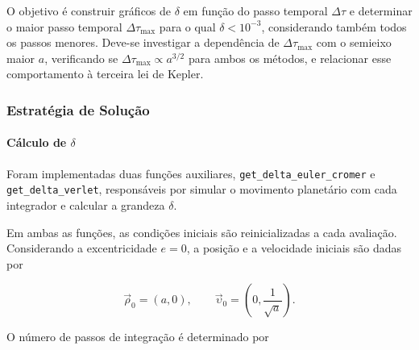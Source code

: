 \documentclass[12pt,a4paper]{article}
\begin{document}
O objetivo é construir gráficos de $\delta$ em função do passo temporal $\Delta\tau$ e determinar o maior passo temporal $\Delta\tau_{\max}$ para o qual $\delta<10^{-3}$, considerando também todos os passos menores. Deve-se investigar a dependência de $\Delta\tau_{\max}$ com o semieixo maior $a$, verificando se $\Delta\tau_{\max}\propto a^{3/2}$ para ambos os métodos, e relacionar esse comportamento à terceira lei de Kepler.

\subsubsection{Estratégia de Solução}

\paragraph{Cálculo de $\delta$}

Foram implementadas duas funções auxiliares,
\texttt{get\_delta\_euler\_cromer} e
\texttt{get\_delta\_verlet}, responsáveis por simular
o movimento planetário com cada integrador e calcular
a grandeza $\delta$.

Em ambas as funções, as condições iniciais são
reinicializadas a cada avaliação. Considerando
a excentricidade $e=0$, a posição e a velocidade
iniciais são dadas por

\begin{equation}
    \vec{\rho}_0=(a,0),
    \qquad
    \vec{\upsilon}_0=
    \left(0,\frac{1}{\sqrt{a}}\right).
\end{equation}

O número de passos de integração é determinado por
\end{document}
